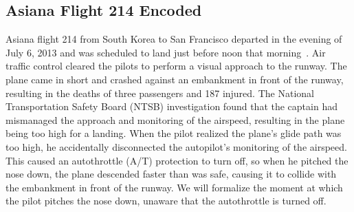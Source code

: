 \subsection{Asiana Flight 214 Encoded}

Asiana flight 214 from South Korea to San Francisco departed in the evening of July 6, 2013 and was scheduled to land just before noon that morning~\cite{asiana}. Air traffic control cleared the pilots to perform a visual approach to the runway. The plane came in short and crashed against an embankment in front of the runway, resulting in the deaths of three passengers and 187 injured. The National Transportation Safety Board (NTSB) investigation found that the captain had mismanaged the approach and monitoring of the airspeed, resulting in the plane being too high for a landing. When the pilot realized the plane's glide path was too high, he accidentally disconnected the autopilot's monitoring of the airspeed. This caused an autothrottle (A/T) protection to turn off, so when he pitched the nose down, the plane descended faster than was safe, causing it to collide with the embankment in front of the runway. We will formalize the moment at which the pilot pitches the nose down, unaware that the autothrottle is turned off.

